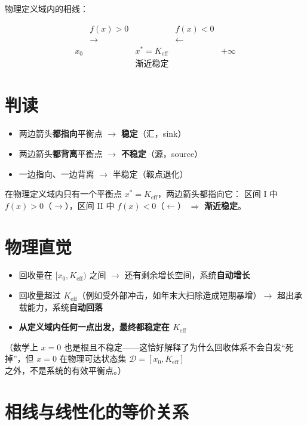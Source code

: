 \documentclass[12pt,a4paper]{article}
\begin{document}
物理定义域内的相线：

\[
\begin{array}{cccccc}
& f(x) > 0 & & f(x) < 0 & \\
& \longrightarrow & & \longleftarrow & \\
\hline
x_0 & & x^* = K_{\text{eff}} & & +\infty \\[6pt]
& & \text{渐近稳定} & &
\end{array}
\]

\section{判读}

\begin{keypoint}
\begin{itemize}
  \item 两边箭头\textbf{都指向}平衡点 $\rightarrow$ \textbf{稳定}（汇，sink）
  \item 两边箭头\textbf{都背离}平衡点 $\rightarrow$ \textbf{不稳定}（源，source）
  \item 一边指向、一边背离 $\rightarrow$ 半稳定（鞍点退化）
\end{itemize}
\end{keypoint}

在物理定义域内只有一个平衡点 $x^* = K_{\text{eff}}$，两边箭头都指向它：
区间 I 中 $f(x) > 0$（$\rightarrow$），区间 II 中 $f(x) < 0$（$\leftarrow$）
$\Rightarrow$ \textbf{渐近稳定}。

\section{物理直觉}

\begin{itemize}
  \item 回收量在 $[x_0, K_{\text{eff}})$ 之间 $\rightarrow$ 还有剩余增长空间，系统\textbf{自动增长}
  \item 回收量超过 $K_{\text{eff}}$（例如受外部冲击，如年末大扫除造成短期暴增）$\rightarrow$ 超出承载能力，系统\textbf{自动回落}
  \item \textbf{从定义域内任何一点出发，最终都稳定在 $K_{\text{eff}}$}
\end{itemize}

（数学上 $x = 0$ 也是根且不稳定——这恰好解释了为什么回收体系不会自发``死掉''，但 $x = 0$ 在物理可达状态集 $\mathcal{D} = [x_0, K_{\text{eff}}]$ 之外，不是系统的有效平衡点。）

\section{相线与线性化的等价关系}
\end{document}

